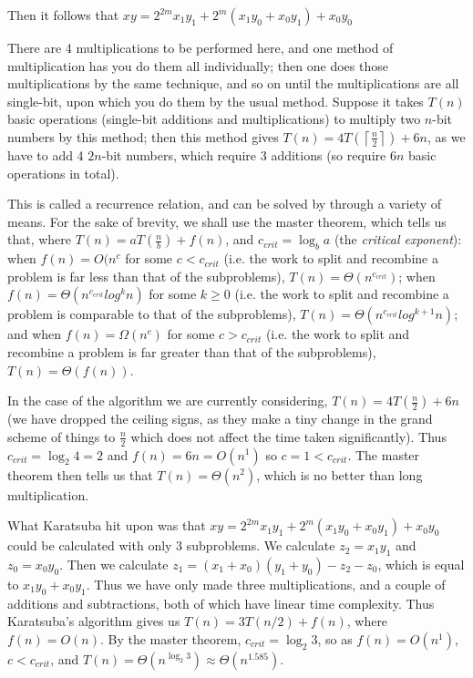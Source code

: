 \documentclass{article}
\begin{document}
Then it follows that \(xy=2^{2m}x_1y_1+2^m(x_1y_0+x_0y_1)+x_0y_0\)

There are 4 multiplications to be performed here, and one method of multiplication has you do them all individually; then one does those multiplications by the same technique, and so on until the multiplications are all single-bit, upon which you do them by the usual method. Suppose it takes \(T(n)\) basic operations (single-bit additions and multiplications) to multiply two \(n\)-bit numbers by this method; then this method gives \(T(n)=4T(\left\lceil{}\frac{n}{2}\right\rceil{})+6n\), as we have to add 4 \(2n\)-bit numbers, which require 3 additions (so require \(6n\) basic operations in total).

This is called a recurrence relation, and can be solved by through a variety of means. For the sake of brevity, we shall use the master theorem, which tells us that, where \(T(n)=aT(\frac{n}{b})+f(n)\), and \(c_{crit}=\log_ba\) (the \textit{critical exponent}): when \(f(n)=O(n^c\) for some \(c<c_{crit}\) (i.e. the work to split and recombine a problem is far less than that of the subproblems), \(T(n)=\Theta(n^{c_{crit}})\); when \(f(n)=\Theta(n^{c_{crit}}log^kn)\) for some \(k\geq0\) (i.e. the work to split and recombine a problem is comparable to that of the subproblems), \(T(n)=\Theta(n^{c_{crit}}log^{k+1}n)\); and when \(f(n)=\Omega(n^c)\) for some \(c>c_{crit}\) (i.e. the work to split and recombine a problem is far greater than that of the subproblems), \(T(n)=\Theta(f(n))\).

In the case of the algorithm we are currently considering, \(T(n)=4T(\frac{n}{2})+6n\) (we have dropped the ceiling signs, as they make a tiny change in the grand scheme of things to \(\frac{n}{2}\) which does not affect the time taken significantly). Thus \(c_{crit}=\log_{2}4=2\) and \(f(n)=6n=O(n^1)\) so \(c=1<c_{crit}\). The master theorem then tells us that \(T(n)=\Theta(n^2)\), which is no better than long multiplication.

What Karatsuba hit upon was that \(xy=2^{2m}x_1y_1+2^m(x_1y_0+x_0y_1)+x_0y_0\) could be calculated with only 3 subproblems. We calculate \(z_2=x_1y_1\) and \(z_0=x_0y_0\). Then we calculate \(z_1=(x_1+x_0)(y_1+y_0)-z_2-z_0\), which is equal to \(x_1y_0+x_0y_1\). Thus we have only made three multiplications, and a couple of additions and subtractions, both of which have linear time complexity. Thus Karatsuba's algorithm gives us \(T(n)=3T(n/2)+f(n)\), where \(f(n)=O(n)\). By the master theorem, \(c_{crit}=\log_{2}3\), so as \(f(n)=O(n^1)\), \(c<c_{crit}\), and \(T(n)=\Theta(n^{\log_{2}3})\approx{}\Theta(n^{1.585})\).
\end{document}
